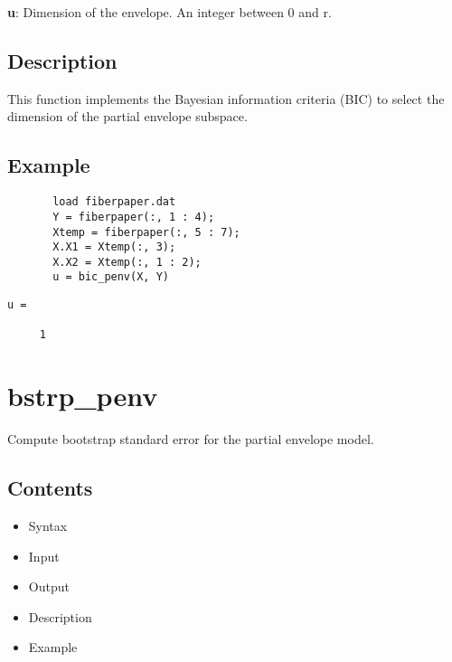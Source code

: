 \documentclass[a4paper,11pt,openany]{memoir}
\begin{document}
\begin{par}
\textbf{u}: Dimension of the envelope. An integer between 0 and r.
\end{par} \vspace{1em}


\subsection*{Description}

\begin{par}
This function implements the Bayesian information criteria (BIC) to select the dimension of the partial envelope subspace.
\end{par} \vspace{1em}


\subsection*{Example}


\begin{verbatim}       load fiberpaper.dat
       Y = fiberpaper(:, 1 : 4);
       Xtemp = fiberpaper(:, 5 : 7);
       X.X1 = Xtemp(:, 3);
       X.X2 = Xtemp(:, 1 : 2);
       u = bic_penv(X, Y)\end{verbatim}
    
        \color{lightgray}\ttfamily \begin{verbatim}
u =

     1

\end{verbatim} \rmfamily
\color{black}
    
\newpage


\rmfamily
\color{black}\section{bstrp\_penv}

\begin{par}
Compute bootstrap standard error for the partial envelope model.
\end{par} \vspace{1em}

\subsection*{Contents}

\begin{itemize}
\setlength{\itemsep}{-1ex}
   \item Syntax
   \item Input
   \item Output
   \item Description
   \item Example
\end{itemize}
\end{document}
